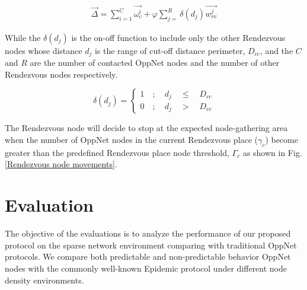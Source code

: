 \begin{eqnarray}
\label{DirectionParameter}
\vec{\Delta} =\sum _{ i=1 }^{ C }{ \vec { { \omega }_{ c }^{ i } }  } + \varphi \sum _{ j= }^{ R }{ \delta\left( d_{j} \right)
	\vec { {w }_{ rv }^{ j } }  }
\end{eqnarray}

While the $\delta\left( d_{j} \right)$ is the on-off function to include only the other Rendezvous nodes whose distance $d_j$ is the range of cut-off distance perimeter, $D_{cc}$, and the  $C$ and $R$ are the number of contacted OppNet nodes and the number of other Rendezvous nodes respectively.

\[\delta \left( { d }_{ j } \right) =\begin{cases} 1\quad ;\quad { d }_{ j }\quad \le { \quad D }_{ cc } \\ 0\quad ;\quad { d }_{ j }\quad >{ \quad D }_{ cc } \end{cases}  \] 

The Rendezvous node will decide to stop at the expected node-gathering area when the number of OppNet nodes in the current Rendezvous place ($\gamma_{c}$) become greater than the predefined Rendezvous place node threshold, $\Gamma_{c}$ as shown in Fig. \ref{Rendezvous node movements}. 

\section{Evaluation}
\label{DRRA:Evaluation}
The objective of the evaluations is to analyze the performance of our proposed protocol on the sparse network environment comparing with traditional OppNet protocols.
We compare both predictable and non-predictable behavior OppNet nodes with the commonly well-known Epidemic protocol\cite{Vahdat2000} under different node density environments.


